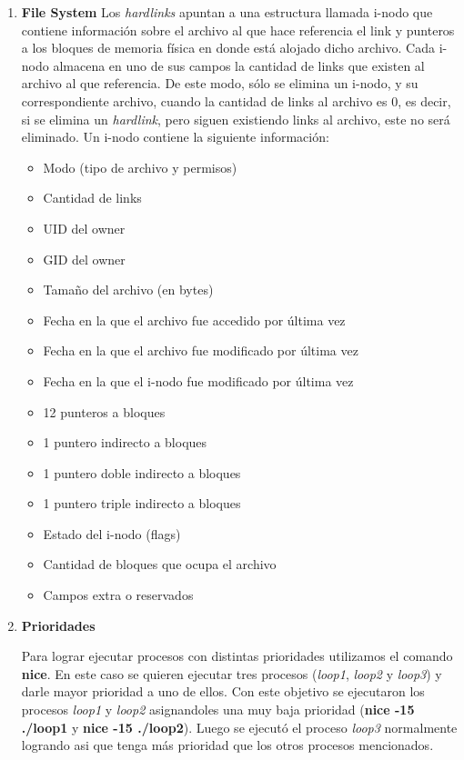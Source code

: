 \documentclass[a4paper,11pt] {article}
\begin{document}
\begin{enumerate}
  \item \textbf{File System}
    Los \textit{hardlinks} apuntan a una estructura llamada i-nodo que contiene información sobre el archivo al que hace referencia el link y punteros a los bloques de memoria física en donde está alojado dicho archivo. Cada i-nodo almacena en uno de sus campos la cantidad de links que existen al archivo al que referencia. De este modo, sólo se elimina un i-nodo, y su correspondiente archivo, cuando la cantidad de links al archivo es 0, es decir, si se elimina un \textit{hardlink}, pero siguen existiendo links al archivo, este no será eliminado.
    Un i-nodo contiene la siguiente información:
    \begin{itemize}
      \item Modo (tipo de archivo y permisos)
      \item Cantidad de links
      \item UID del owner
      \item GID del owner
      \item Tamaño del archivo (en bytes)
      \item Fecha en la que el archivo fue accedido por última vez
      \item Fecha en la que el archivo fue modificado por última vez
      \item Fecha en la que el i-nodo fue modificado por última vez
      \item 12 punteros a bloques
      \item 1 puntero indirecto a bloques
      \item 1 puntero doble indirecto a bloques
      \item 1 puntero triple indirecto a bloques
      \item Estado del i-nodo (flags)
      \item Cantidad de bloques que ocupa el archivo
      \item Campos extra o reservados
    \end{itemize}

  \item \textbf{Prioridades}

    Para lograr ejecutar procesos con distintas prioridades utilizamos el comando \textbf{nice}. En este caso se quieren ejecutar tres procesos (\textit{loop1}, \textit{loop2} y \textit{loop3}) y darle mayor prioridad a uno de ellos. Con este objetivo se ejecutaron los procesos \textit{loop1} y \textit{loop2} asignandoles una muy baja prioridad (\textbf{nice -15 ./loop1} y \textbf{nice -15 ./loop2}). Luego se ejecut\'o el proceso \textit{loop3} normalmente logrando asi que tenga m\'as prioridad que los otros procesos mencionados.


\end{enumerate}
\end{document}
